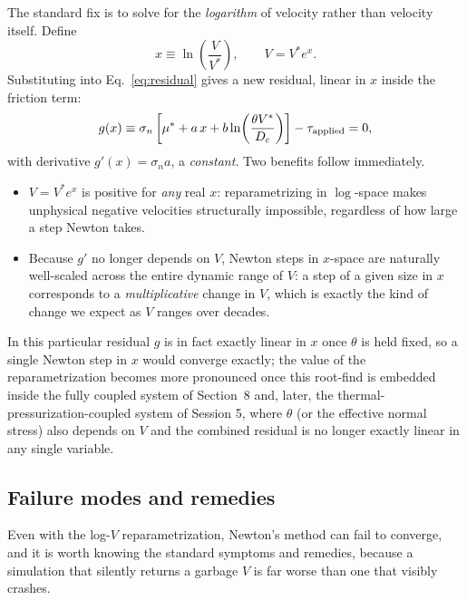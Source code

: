 The standard fix is to solve for the \emph{logarithm} of velocity rather than velocity itself. Define
\begin{equation}
x \equiv \ln\!\left(\frac{V}{V^\ast}\right), \qquad V = V^\ast e^{x}.
\end{equation}
Substituting into Eq.~\eqref{eq:residual} gives a new residual, linear in $x$ inside the friction term:
\begin{equation}
g(x) \equiv \sigma_n\left[\mu^\ast + a\,x + b \ln\!\left(\frac{\theta V^\ast}{D_c}\right)\right] - \tau_{\mathrm{applied}} = 0,
\end{equation}
with derivative $g'(x) = \sigma_n a$, a \emph{constant}. Two benefits follow immediately.
\begin{itemize}
\item $V = V^\ast e^x$ is positive for \emph{any} real $x$: reparametrizing in $\log$-space makes unphysical negative velocities structurally impossible, regardless of how large a step Newton takes.
\item Because $g'$ no longer depends on $V$, Newton steps in $x$-space are naturally well-scaled across the entire dynamic range of $V$: a step of a given size in $x$ corresponds to a \emph{multiplicative} change in $V$, which is exactly the kind of change we expect as $V$ ranges over decades.
\end{itemize}
In this particular residual $g$ is in fact exactly linear in $x$ once $\theta$ is held fixed, so a single Newton step in $x$ would converge exactly; the value of the reparametrization becomes more pronounced once this root-find is embedded inside the fully coupled system of Section~8 and, later, the thermal-pressurization-coupled system of Session 5, where $\theta$ (or the effective normal stress) also depends on $V$ and the combined residual is no longer exactly linear in any single variable.

\subsection{Failure modes and remedies}

Even with the log-$V$ reparametrization, Newton's method can fail to converge, and it is worth knowing the standard symptoms and remedies, because a simulation that silently returns a garbage $V$ is far worse than one that visibly crashes.

